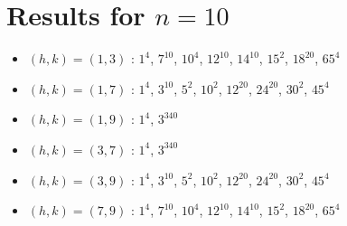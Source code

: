 \section{Results for $n=10$}
\begin{itemize}
\item $(h,k)=(1,3)$ : $1^{4}$, $7^{10}$, $10^{4}$, $12^{10}$, $14^{10}$, $15^{2}$, $18^{20}$, $65^{4}$
\item $(h,k)=(1,7)$ : $1^{4}$, $3^{10}$, $5^{2}$, $10^{2}$, $12^{20}$, $24^{20}$, $30^{2}$, $45^{4}$
\item $(h,k)=(1,9)$ : $1^{4}$, $3^{340}$
\item $(h,k)=(3,7)$ : $1^{4}$, $3^{340}$
\item $(h,k)=(3,9)$ : $1^{4}$, $3^{10}$, $5^{2}$, $10^{2}$, $12^{20}$, $24^{20}$, $30^{2}$, $45^{4}$
\item $(h,k)=(7,9)$ : $1^{4}$, $7^{10}$, $10^{4}$, $12^{10}$, $14^{10}$, $15^{2}$, $18^{20}$, $65^{4}$
\end{itemize}
